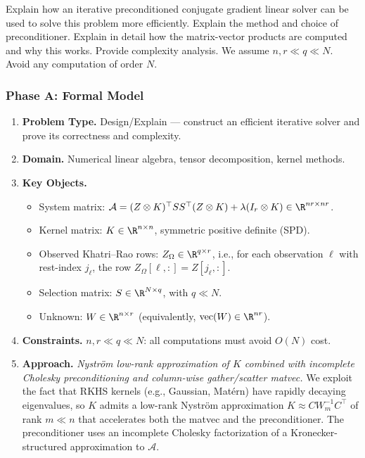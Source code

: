 Explain how an iterative preconditioned conjugate gradient linear solver can be used to solve this
problem more efficiently. Explain the method and choice of preconditioner. Explain in detail how the
matrix-vector products are computed and why this works. Provide complexity analysis. We assume
$n, r \ll q \ll N$. Avoid any computation of order $N$.


\subsubsection*{Phase A: Formal Model}

\begin{enumerate}
\item \textbf{Problem Type.} Design/Explain --- construct an efficient iterative solver and
      prove its correctness and complexity.
\item \textbf{Domain.} Numerical linear algebra, tensor decomposition, kernel methods.
\item \textbf{Key Objects.}
  \begin{itemize}
    \item System matrix: $\mathcal{A} = (Z \otimes K)^\top S S^\top (Z \otimes K) + \lambda(I_r \otimes K) \in \R^{nr \times nr}$.
    \item Kernel matrix: $K \in \R^{n \times n}$, symmetric positive definite (SPD).
    \item Observed Khatri--Rao rows: $Z_\Omega \in \R^{q \times r}$, i.e., for each observation $\ell$
          with rest-index $j_\ell$, the row $Z_\Omega[\ell,:] = Z[j_\ell,:]$.
    \item Selection matrix: $S \in \R^{N \times q}$, with $q \ll N$.
    \item Unknown: $W \in \R^{n \times r}$ (equivalently, $\operatorname{vec}(W) \in \R^{nr}$).
  \end{itemize}
\item \textbf{Constraints.} $n, r \ll q \ll N$: all computations must avoid $O(N)$ cost.
\item \textbf{Approach.} \emph{Nystr\"om low-rank approximation of $K$ combined with
      incomplete Cholesky preconditioning and column-wise gather/scatter matvec.}
      We exploit the fact that RKHS kernels (e.g., Gaussian, Mat\'ern) have rapidly
      decaying eigenvalues, so $K$ admits a low-rank Nystr\"om approximation
      $K \approx C W_m^{-1} C^\top$ of rank $m \ll n$ that accelerates both the matvec
      and the preconditioner. The preconditioner uses an incomplete Cholesky
      factorization of a Kronecker-structured approximation to $\mathcal{A}$.
\end{enumerate}

